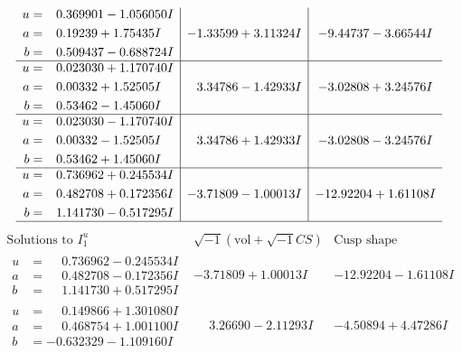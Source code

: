 \documentclass[1p]{elsarticle_modified}
\theoremstyle{definition}
\newcommand{\I}{\sqrt{-1}}
\begin{document}
$$\begin{array}{c|c|c}
\begin{aligned}
u &= \phantom{-}0.369901 - 1.056050 I \\
a &= \phantom{-}0.19239 + 1.75435 I \\
b &= \phantom{-}0.509437 - 0.688724 I\end{aligned}
 & -1.33599 + 3.11324 I & -9.44737 - 3.66544 I \\ \hline\begin{aligned}
u &= \phantom{-}0.023030 + 1.170740 I \\
a &= \phantom{-}0.00332 + 1.52505 I \\
b &= \phantom{-}0.53462 - 1.45060 I\end{aligned}
 & \phantom{-}3.34786 - 1.42933 I & -3.02808 + 3.24576 I \\ \hline\begin{aligned}
u &= \phantom{-}0.023030 - 1.170740 I \\
a &= \phantom{-}0.00332 - 1.52505 I \\
b &= \phantom{-}0.53462 + 1.45060 I\end{aligned}
 & \phantom{-}3.34786 + 1.42933 I & -3.02808 - 3.24576 I \\ \hline\begin{aligned}
u &= \phantom{-}0.736962 + 0.245534 I \\
a &= \phantom{-}0.482708 + 0.172356 I \\
b &= \phantom{-}1.141730 - 0.517295 I\end{aligned}
 & -3.71809 - 1.00013 I & -12.92204 + 1.61108 I\\
 \hline 
 \end{array}$$\newpage$$\begin{array}{c|c|c}  
\text{Solutions to }I^u_{1}& \I (\text{vol} + \sqrt{-1}CS) & \text{Cusp shape}\\
 \hline 
\begin{aligned}
u &= \phantom{-}0.736962 - 0.245534 I \\
a &= \phantom{-}0.482708 - 0.172356 I \\
b &= \phantom{-}1.141730 + 0.517295 I\end{aligned}
 & -3.71809 + 1.00013 I & -12.92204 - 1.61108 I \\ \hline\begin{aligned}
u &= \phantom{-}0.149866 + 1.301080 I \\
a &= \phantom{-}0.468754 + 1.001100 I \\
b &= -0.632329 - 1.109160 I\end{aligned}
 & \phantom{-}3.26690 - 2.11293 I & -4.50894 + 4.47286 I \\ \hline\begin{aligned}

\end{aligned}
\end{array}$$
\end{document}
